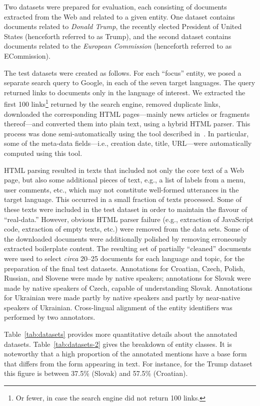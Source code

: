 \documentclass[11pt]{article}
\begin{document}
Two datasets were prepared for evaluation, each consisting of documents extracted from the Web
and related to a given entity.  One dataset contains documents related to {\em Donald Trump}, the
recently elected President of United States (henceforth referred to as {\sc Trump}), and the
second dataset contains documents related to the {\em European Commission} (henceforth referred to
as {\sc ECommission}).

The test datasets were created as follows.  For each ``focus'' entity, we posed a separate
search query to Google, in each of the seven target languages.  The query returned links to
documents only in the language of interest.  We extracted the first 100 links\footnote{Or
  fewer, in case the search engine did not return 100 links.} returned by the search engine,
removed duplicate links, downloaded the corresponding HTML pages---mainly news articles or
fragments thereof---and converted them into plain text, using a hybrid HTML parser.  This
process was done semi-automatically using the tool described in~\cite{Crawley:ea:2010}.  In
particular, some of the meta-data fields---i.e., creation date, title, URL---were automatically
computed using this tool.

HTML parsing resulted in texts that included not only the core text of a Web page, but also
some additional pieces of text, e.g., a list of labels from a menu, user comments, etc., which
may not constitute well-formed utterances in the target language.  This occurred in a small
fraction of texts processed.  Some of these texts were included in the test dataset in order
to maintain the flavour of ``real-data.''  However, obvious HTML parser failure (e.g.,
extraction of JavaScript code, extraction of empty texts, etc.) were removed from the data
sets.  Some of the downloaded documents were additionally polished by removing erroneously
extracted boilerplate content.  The resulting set of partially ``cleaned'' documents were used
to select {\em circa} 20--25 documents for each language and topic, for the preparation of the
final test datasets.  Annotations for Croatian, Czech, Polish, Russian, and Slovene were made
by native speakers; annotations for Slovak were made by native speakers of Czech, capable of
understanding Slovak.  Annotations for Ukrainian were made partly by native speakers and
partly by near-native speakers of Ukrainian.  Cross-lingual alignment of the entity
identifiers was performed by two annotators.

Table~\ref{tab:datasets} provides more quantitative details about the annotated datasets.
Table~\ref{tab:datasets-2} gives the breakdown of entity classes.  It is noteworthy that a
high proportion of the annotated mentions have a base form that differs from the form
appearing in text.  For instance, for the {\sc Trump} dataset this figure is between 37.5\%
(Slovak) and 57.5\% (Croatian).
\end{document}
